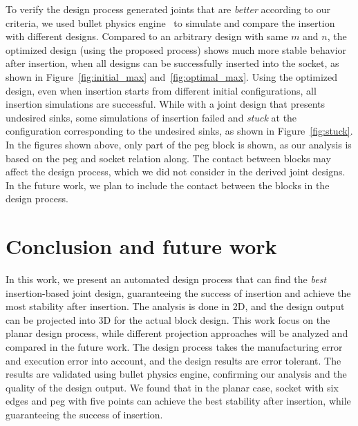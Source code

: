 \documentclass[letterpaper, 10 pt, conference]{ieeeconf}
\begin{document}
To verify the design process generated joints that are {\em better} according to our criteria, we used bullet physics engine~\cite{coumans2019} to simulate and compare the insertion with different designs. Compared to an arbitrary design with same $m$ and $n$, the optimized design (using the proposed process) shows much more stable behavior after insertion, when all designs can be successfully inserted into the socket, as shown in Figure~\ref{fig:initial_max} and~\ref{fig:optimal_max}. Using the optimized design, even when insertion starts from different initial configurations, all insertion simulations are successful. While with a joint design that presents undesired sinks, some simulations of insertion failed and {\em stuck} at the configuration corresponding to the undesired sinks, as shown in Figure~\ref{fig:stuck}. In the figures shown above, only part of the peg block is shown, as our analysis is based on the peg and socket relation along. The contact between blocks may affect the design process, which we did not consider in the derived joint designs. In the future work, we plan to include the contact between the blocks in the design process. 

\section{Conclusion and future work}

In this work, we present an automated design process that can find the {\em best} insertion-based joint design, guaranteeing the success of insertion and achieve the most stability after insertion. The analysis is done in 2D, and the design output can be projected into 3D for the actual block design. This work focus on the planar design process, while different projection approaches will be analyzed and compared in the future work. The design process takes the manufacturing error and execution error into account, and the design results are error tolerant. The results are validated using bullet physics engine, confirming our analysis and the quality of the design output. We found that in the planar case, socket with six edges and peg with five points can achieve the best stability after insertion, while guaranteeing the success of insertion. 


\renewcommand*{\bibfont}{\small}
\printbibliography
\end{document}
